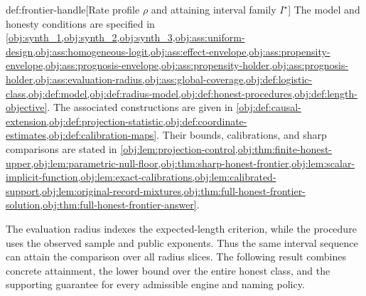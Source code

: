 \documentclass[11pt]{article}
\begin{document}
\begin{definitionv}{def:frontier-handle}[Rate profile $\rho$ and attaining interval family $I^\star$]
The model and honesty conditions are specified in \cref{obj:synth_1,obj:synth_2,obj:synth_3,obj:ass:uniform-design,obj:ass:homogeneous-logit,obj:ass:effect-envelope,obj:ass:propensity-envelope,obj:ass:prognosis-envelope,obj:ass:propensity-holder,obj:ass:prognosis-holder,obj:ass:evaluation-radius,obj:ass:global-coverage,obj:def:logistic-class,obj:def:model,obj:def:radius-model,obj:def:honest-procedures,obj:def:length-objective}. The associated constructions are given in \cref{obj:def:causal-extension,obj:def:projection-statistic,obj:def:coordinate-estimates,obj:def:calibration-maps}. Their bounds, calibrations, and sharp comparisons are stated in \cref{obj:lem:projection-control,obj:thm:finite-honest-upper,obj:lem:parametric-null-floor,obj:thm:sharp-honest-frontier,obj:lem:scalar-implicit-function,obj:lem:exact-calibrations,obj:lem:calibrated-support,obj:lem:original-record-mixtures,obj:thm:full-honest-frontier-solution,obj:thm:full-honest-frontier-answer}.
\end{definitionv}

The evaluation radius indexes the expected-length criterion, while the procedure uses the observed sample and public exponents. Thus the same interval sequence can attain the comparison over all radius slices. The following result combines concrete attainment, the lower bound over the entire honest class, and the supporting guarantee for every admissible engine and naming policy.
\end{document}
